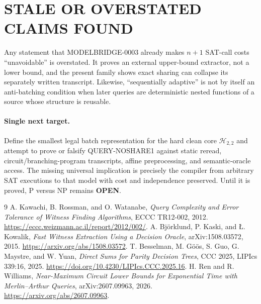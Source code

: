 \documentclass[11pt]{article}
\begin{document}
\section{STALE OR OVERSTATED CLAIMS FOUND}
Any statement that MODELBRIDGE-0003 already makes $n+1$ SAT-call costs
``unavoidable'' is overstated.  It proves an external upper-bound extractor,
not a lower bound, and the present family shows exact sharing can collapse its
separately written transcript.  Likewise, ``sequentially adaptive'' is not by
itself an anti-batching condition when later queries are deterministic nested
functions of a source whose structure is reusable.

\paragraph{Single next target.}
Define the smallest legal batch representation for the hard clean core
$\mathcal H_{2,2}$ and attempt to prove or falsify QUERY-NOSHARE1 against
static reread, circuit/branching-program transcripts, affine preprocessing,
and semantic-oracle access.  The missing universal implication is precisely
the compiler from arbitrary SAT executions to that model with cost and
independence preserved.  Until it is proved, P versus NP remains
\textbf{OPEN}.

\begin{thebibliography}{9}
 A. Kawachi, B. Rossman, and O. Watanabe,
\emph{Query Complexity and Error Tolerance of Witness Finding Algorithms},
ECCC TR12-002, 2012. \url{https://eccc.weizmann.ac.il/report/2012/002/}.
 A. Bj\"orklund, P. Kaski, and \L. Kowalik,
\emph{Fast Witness Extraction Using a Decision Oracle}, arXiv:1508.03572,
2015. \url{https://arxiv.org/abs/1508.03572}.
 T. Besselman, M. G\"o\"os, S. Guo, G. Maystre, and W. Yuan,
\emph{Direct Sums for Parity Decision Trees}, CCC 2025, LIPIcs 339:16,
2025. \url{https://doi.org/10.4230/LIPIcs.CCC.2025.16}.
 H. Ren and R. Williams,
\emph{Near-Maximum Circuit Lower Bounds for Exponential Time with
Merlin--Arthur Queries}, arXiv:2607.09963, 2026.
\url{https://arxiv.org/abs/2607.09963}.
\end{thebibliography}

\end{document}
